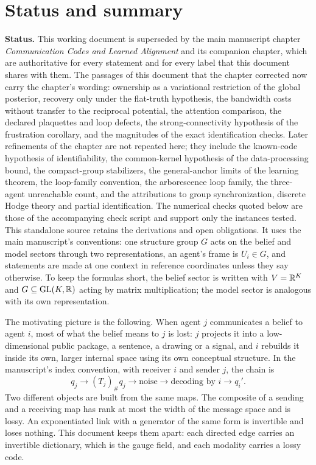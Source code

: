 \documentclass[11pt,letterpaper]{report}
\begin{document}
\hypersetup{pageanchor=false}
\hypersetup{pageanchor=true}
\chapter*{Status and summary}
\textbf{Status.} This working document is superseded by the main manuscript chapter \emph{Communication Codes and Learned Alignment} and its companion chapter, which are authoritative for every statement and for every label that this document shares with them. The passages of this document that the chapter corrected now carry the chapter's wording: ownership as a variational restriction of the global posterior, recovery only under the flat-truth hypothesis, the bandwidth costs without transfer to the reciprocal potential, the attention comparison, the declared plaquettes and loop defects, the strong-connectivity hypothesis of the frustration corollary, and the magnitudes of the exact identification checks. Later refinements of the chapter are not repeated here; they include the known-code hypothesis of identifiability, the common-kernel hypothesis of the data-processing bound, the compact-group stabilizers, the general-anchor limits of the learning theorem, the loop-family convention, the arborescence loop family, the three-agent unreachable count, and the attributions to group synchronization, discrete Hodge theory and partial identification. The numerical checks quoted below are those of the accompanying check script and support only the instances tested. This standalone source retains the derivations and open obligations. It uses the main manuscript's conventions: one structure group $G$ acts on the belief and model sectors through two representations, an agent's frame is $U_i\in G$, and statements are made at one context in reference coordinates unless they say otherwise. To keep the formulas short, the belief sector is written with $V=\mathbb R^K$ and $G\subseteq\mathrm{GL}(K,\mathbb R)$ acting by matrix multiplication; the model sector is analogous with its own representation.

The motivating picture is the following. When agent $j$ communicates a belief to agent $i$, most of what the belief means to $j$ is lost: $j$ projects it into a low-dimensional public package, a sentence, a drawing or a signal, and $i$ rebuilds it inside its own, larger internal space using its own conceptual structure. In the manuscript's index convention, with receiver $i$ and sender $j$, the chain is
\begin{equation}
q_j\longrightarrow(T_j)_\#q_j\longrightarrow\text{noise}\longrightarrow\text{decoding by }i\longrightarrow q_i'.
\label{it1:chain}
\end{equation}
Two different objects are built from the same maps. The composite of a sending and a receiving map has rank at most the width of the message space and is lossy. An exponentiated link with a generator of the same form is invertible and loses nothing. This document keeps them apart: each directed edge carries an invertible dictionary, which is the gauge field, and each modality carries a lossy code.
\end{document}
